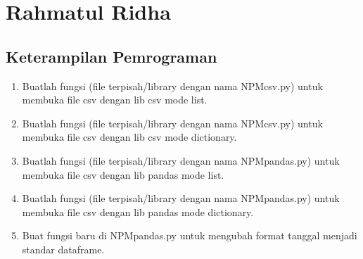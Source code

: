 
\section{Rahmatul Ridha}
\subsection{Keterampilan Pemrograman}
\begin{enumerate}
	\item Buatlah  fungsi  (file  terpisah/library  dengan  nama  NPMcsv.py)  untuk  membuka file csv dengan lib csv mode list.
	
	
	
	\item Buatlah  fungsi  (file  terpisah/library  dengan  nama  NPMcsv.py)  untuk  membuka file csv dengan lib csv mode dictionary.
	
	
	
	\item Buatlah fungsi (file terpisah/library dengan nama NPMpandas.py) untuk membuka file csv dengan lib pandas mode list.
	
	
	
	\item Buatlah fungsi (file terpisah/library dengan nama NPMpandas.py) untuk membuka file csv dengan lib pandas mode dictionary.
	
	
	
	\item  Buat fungsi baru di NPMpandas.py untuk mengubah format tanggal menjadi standar dataframe.
	
	
	

\end{enumerate}
